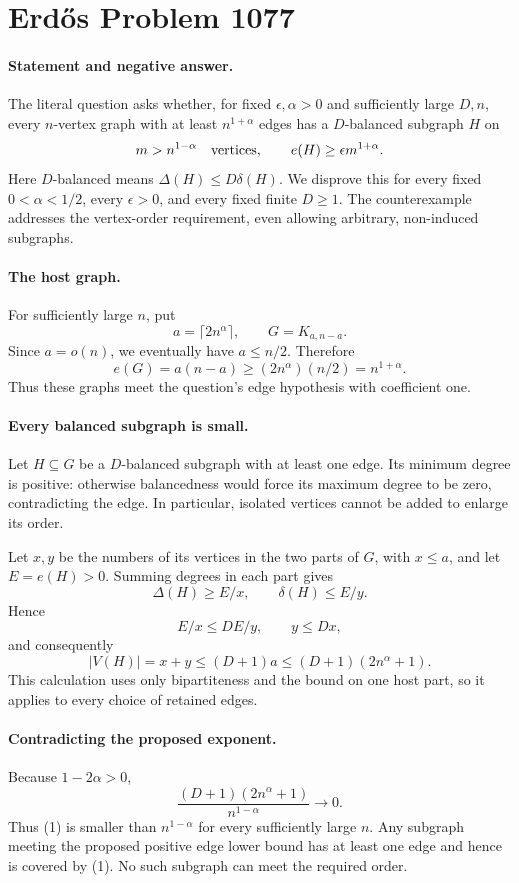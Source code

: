 \section*{Erd\H{o}s Problem 1077}

\paragraph{Statement and negative answer.}
The literal question asks whether, for fixed \(\epsilon,\alpha>0\) and sufficiently large \(D,n\), every \(n\)-vertex graph with at least \(n^{1+\alpha}\) edges has a \(D\)-balanced subgraph \(H\) on
\[
 m>n^{1-\alpha}\quad\hbox{vertices},\qquad
 e(H)\geq\epsilon m^{1+\alpha}.
\]
Here \(D\)-balanced means \(\Delta(H)\leq D\delta(H)\). We disprove this for every fixed \(0<\alpha<1/2\), every \(\epsilon>0\), and every fixed finite \(D\geq1\). The counterexample addresses the vertex-order requirement, even allowing arbitrary, non-induced subgraphs.

\paragraph{The host graph.}
For sufficiently large \(n\), put
\[
 a=\lceil2n^\alpha\rceil,\qquad G=K_{a,n-a}.
\]
Since \(a=o(n)\), we eventually have \(a\leq n/2\). Therefore
\[
 e(G)=a(n-a)\geq(2n^\alpha)(n/2)=n^{1+\alpha}.
\]
Thus these graphs meet the question's edge hypothesis with coefficient one.

\paragraph{Every balanced subgraph is small.}
Let \(H\subseteq G\) be a \(D\)-balanced subgraph with at least one edge. Its minimum degree is positive: otherwise balancedness would force its maximum degree to be zero, contradicting the edge. In particular, isolated vertices cannot be added to enlarge its order.

Let \(x,y\) be the numbers of its vertices in the two parts of \(G\), with \(x\leq a\), and let \(E=e(H)>0\). Summing degrees in each part gives
\[
 \Delta(H)\geq E/x,\qquad \delta(H)\leq E/y.
\]
Hence
\[
 E/x\leq D E/y,\qquad y\leq Dx,
\]
and consequently
\[
 |V(H)|=x+y\leq(D+1)a
 \leq(D+1)(2n^\alpha+1). \tag{1}
\]
This calculation uses only bipartiteness and the bound on one host part, so it applies to every choice of retained edges.

\paragraph{Contradicting the proposed exponent.}
Because \(1-2\alpha>0\),
\[
 \frac{(D+1)(2n^\alpha+1)}{n^{1-\alpha}}\longrightarrow0.
\]
Thus (1) is smaller than \(n^{1-\alpha}\) for every sufficiently large \(n\). Any subgraph meeting the proposed positive edge lower bound has at least one edge and hence is covered by (1). No such subgraph can meet the required order.

